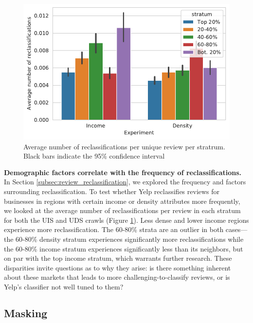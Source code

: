 \begin{figure}[t]
    \centering
    \includegraphics[width=0.9\columnwidth]{chapters/reviews/figures/stratified_reclass_swaps_usa.pdf}
    \caption{Average number of reclassifications per unique review per stratrum. Black bars indicate the 95\% confidence interval}
    \label{fig:stratified_reclass_swaps_usa}
\end{figure}

\textbf{Demographic factors correlate with the frequency of reclassifications.} In Section \ref{subsec:review_reclassification}, we explored the frequency and factors surrounding reclassification. To test whether Yelp reclassifies reviews for businesses in regions with certain income or density attributes more frequently, we looked at the average number of reclassifications per review in each stratum for both the UIS and UDS crawls (Figure \ref{fig:stratified_reclass_swaps_usa}). Less dense and lower income regions experience more reclassification. The 60-80\% strata are an outlier in both cases---the 60-80\% density stratum experiences significantly more reclassifications while the 60-80\% income stratum experiences significantly less than its neighbors, but on par with the top income stratum, which warrants further research. These disparities invite questions as to why they arise: is there something inherent about these markets that leads to more challenging-to-classify reviews, or is Yelp's classifier not well tuned to them?



\subsection{Masking}

